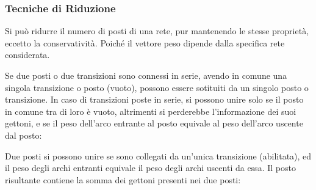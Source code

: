 \documentclass{article}
\numberwithin{equation}{subsection}
\begin{document}
\subsubsection{Tecniche di Riduzione}

Si può ridurre il numero di posti di una rete, pur mantenendo le stesse proprietà, eccetto la conservatività. Poiché il vettore peso dipende dalla specifica rete considerata. 

Se due posti o due transizioni sono connessi in serie, avendo in comune una singola transizione o posto (vuoto), possono essere sotituiti da un singolo posto o transizione. 
In caso di transizioni poste in serie, si possono unire solo se il posto in comune tra di loro è vuoto, altrimenti si perderebbe l'informazione dei suoi gettoni, e se il peso 
dell'arco entrante al posto equivale al peso dell'arco uscente dal posto:
\begin{center}
\end{center}

Due posti si possono unire se sono collegati da un'unica transizione (abilitata), ed il peso degli archi entranti equivale il peso degli archi uscenti da essa. Il posto 
risultante contiene la somma dei gettoni presenti nei due posti:
\end{document}

